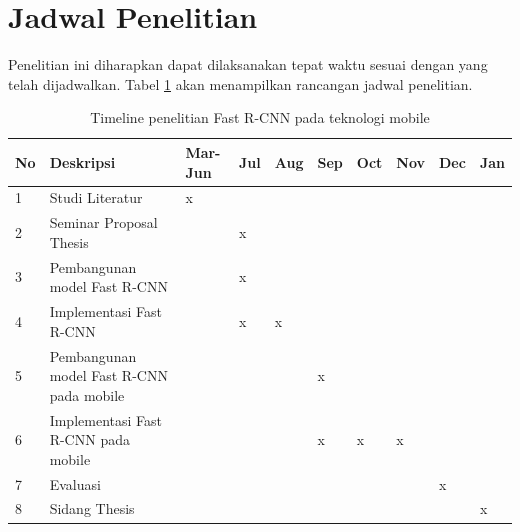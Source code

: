 \section{Jadwal Penelitian}
Penelitian ini diharapkan dapat dilaksanakan tepat waktu sesuai dengan yang telah dijadwalkan. Tabel \ref{tab:timeline_penelitian} akan menampilkan rancangan jadwal penelitian.
\begin{table}
		\centering
	\caption{Timeline penelitian Fast R-CNN pada teknologi mobile}
	\label{tab:timeline_penelitian}
	\begin{tabular}{|l|m{3cm}|l|l|l|l|l|l|l|l|}
		\hline
		No & Deskripsi & Mar-Jun& Jul & Aug & Sep & Oct & Nov & Dec & Jan\\ 
		\hline
		1 & Studi Literatur&x&&&&&&&\\
		\hline
		2 & Seminar Proposal Thesis&&x&&&&&&\\
		\hline
		3 & Pembangunan model Fast R-CNN&&x&&&&&&\\
		\hline
		4 & Implementasi Fast R-CNN&&x&x&&&&&\\
		\hline
		5 & Pembangunan model Fast R-CNN pada mobile&&&&x&&&&\\
		\hline
		6 & Implementasi Fast R-CNN pada mobile&&&&x&x&x&&\\
		\hline
		7 & Evaluasi&&&&&&&x&\\
		\hline
		8 & Sidang Thesis&&&&&&&&x\\
		\hline
	\end{tabular}
\end{table}